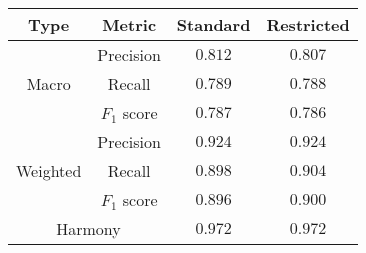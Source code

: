 \begin{tabular}{cccc}
    \textbf{Type} & \textbf{Metric} & \textbf{Standard} & \textbf{Restricted} \\\hline
    \multirow{3}{*}{Macro}    & Precision  & $0.812$ & $0.807$ \\
                              & Recall     & $0.789$ & $0.788$ \\
                              & $F_1$ score & $0.787$ & $0.786$ \\\hline
    \multirow{3}{*}{Weighted} & Precision  & $0.924$ & $0.924$ \\
                              & Recall     & $0.898$ & $0.904$ \\
                              & $F_1$ score & $0.896$ & $0.900$ \\\hline
    \multicolumn{2}{c}{Harmony} & $0.972$ & $0.972$ \\
\end{tabular}
